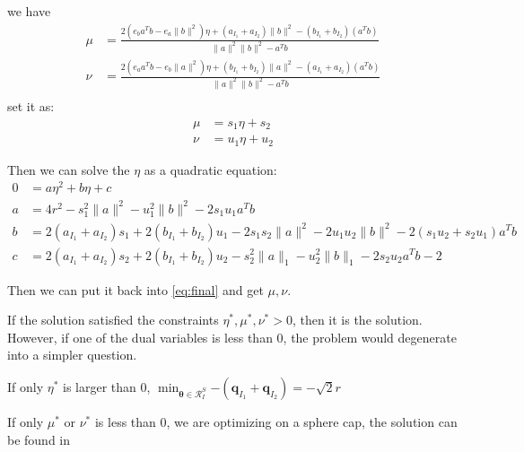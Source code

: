\documentclass[twoside]{article}
\theoremstyle{plain}
\newcommand{\tranT}{T}
\renewcommand{\vec}[1]{\bm{#1}}
\begin{document}
we have 
\begin{equation}
\begin{split} 
\mu &= \frac{2( e_ba^{\tranT}b - e_a\|b\|^2 )\eta + (a_{I_1}+a_{I_2}) \|b\|^2 - (b_{I_1} + b_{I_2}) (a^{\tranT}b)}{ \|a\|^2 \|b\|^2 -a^{\tranT}b}\\
\nu &=\frac{2( e_aa^{\tranT}b - e_b\|a\|^2 )\eta + (b_{I_1}+b_{I_2}) \|a\|^2 - (a_{I_1} + a_{I_2}) (a^{\tranT}b)}{ \|a\|^2 \|b\|^2 -a^{\tranT}b}\\
 \end{split}
\end{equation}
set it as:
\begin{equation}
\begin{split} 
\mu &= s_1 \eta + s_2\\ 
\nu &= u_1 \eta + u_2
 \end{split}
 \label{eq:final}
\end{equation}

Then we can solve the $\eta$ as a quadratic equation:
\begin{equation}
\begin{split} 
0&=a\eta^2+b\eta+c\\
 a&= 4r^2 - s_1^2\|a\|^2 - u_1^2\|b\|^2 -2s_1 u_1a^{\tranT}b\\
b&=2(a_{I_1} + a_{I_2})s_1 +2(b_{I_1} + b_{I_2})u_1 - 2s_1s_2 \|a\|^2 - 2u_1u_2\|b\|^2 - 2(s_1u_2+s_2u_1)a^{\tranT}b \\
 c&=2(a_{I_1} + a_{I_2})s_2 +2(b_{I_1} + b_{I_2})u_2 -s_2^2\|a\|_1 -u_2^2\|b\|_1 - 2s_2u_2a^{\tranT}b -2
 \end{split}
\end{equation}

Then we can put it back into \ref{eq:final} and get $\mu, \nu$.

If the solution satisfied the constraints $\eta^{*}, \mu^{*}, \nu^{*} > 0$, then it is the solution.
However, if one of the dual variables is less than 0, the problem would degenerate into a simpler question. 

If only $\eta^{*}$ is larger than 0, 
 $\min_{\vec{\theta} \in \mathcal{R}^{S}_{I}}{- ( \vec{q}_{I_1} +\vec{q}_{I_2} )} = -\sqrt{2}r$

If only $\mu^{*}$ or $\nu^{*}$ is less than 0, we are optimizing on a sphere cap, the solution can be found in \cite[Appendix B]{NEURIPS2021_7b5b23f4}
\end{document}
